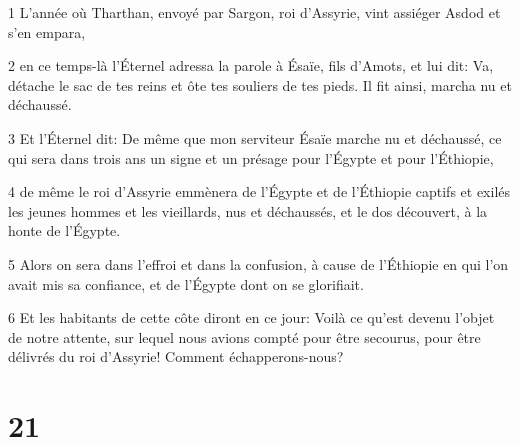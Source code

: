 \par 1 L'année où Tharthan, envoyé par Sargon, roi d'Assyrie, vint assiéger Asdod et s'en empara,
\par 2 en ce temps-là l'Éternel adressa la parole à Ésaïe, fils d'Amots, et lui dit: Va, détache le sac de tes reins et ôte tes souliers de tes pieds. Il fit ainsi, marcha nu et déchaussé.
\par 3 Et l'Éternel dit: De même que mon serviteur Ésaïe marche nu et déchaussé, ce qui sera dans trois ans un signe et un présage pour l'Égypte et pour l'Éthiopie,
\par 4 de même le roi d'Assyrie emmènera de l'Égypte et de l'Éthiopie captifs et exilés les jeunes hommes et les vieillards, nus et déchaussés, et le dos découvert, à la honte de l'Égypte.
\par 5 Alors on sera dans l'effroi et dans la confusion, à cause de l'Éthiopie en qui l'on avait mis sa confiance, et de l'Égypte dont on se glorifiait.
\par 6 Et les habitants de cette côte diront en ce jour: Voilà ce qu'est devenu l'objet de notre attente, sur lequel nous avions compté pour être secourus, pour être délivrés du roi d'Assyrie! Comment échapperons-nous?

\chapter{21}

